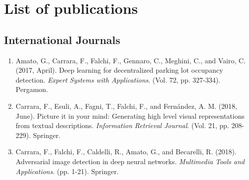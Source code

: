 \chapter*{List of publications}


\section*{International Journals}
\begin{enumerate}
    \item Amato, G., Carrara, F., Falchi, F., Gennaro, C., Meghini, C., and Vairo, C. (2017, April). Deep learning for decentralized parking lot occupancy detection. \emph{Expert Systems with Applications}. (Vol. 72, pp. 327-334). Pergamon.
    \item Carrara, F., Esuli, A., Fagni, T., Falchi, F., and Fernández, A. M. (2018, June). Picture it in your mind: Generating high level visual representations from textual descriptions. \emph{Information Retrieval Journal}. (Vol. 21, pp. 208-229). Springer.
    \item Carrara, F., Falchi, F., Caldelli, R., Amato, G., and Becarelli, R. (2018). Adversarial image detection in deep neural networks. \emph{Multimedia Tools and Applications}. (pp. 1-21). Springer.

\end{enumerate}

